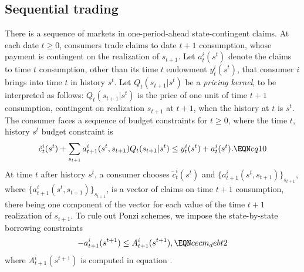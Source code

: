 \subsection{Sequential trading}
There is a sequence of markets in one-period-ahead
state-contingent
 claims.    At each date $t \geq 0$,
consumers trade claims to date $t+1$ consumption, whose payment
is  contingent
on the realization of $s_{t+1}$.   Let $a_t^i(s^t)$ denote the
claims to time $t$ consumption, other than its time $t$  endowment $y_t^i(s^t)$,
that consumer $i$ brings into time $t$ in history $s^t$. Let
$ Q_t(s_{t+1} | s^t)$
be a {\it pricing kernel},  to be interpreted as follows:
$Q_t(s_{t+1} | s^t)$ is the price of one unit of time $t+1$ consumption,
contingent on realization $s_{t+1}$ at $t+1$, when the
history at $t$ is $s^t$.
The consumer faces a sequence of budget constraints
for $t \geq 0$, where the time $t$, history $s^t$ budget constraint is
$$ \tilde c_t^i(s^t) + \sum_{s_{t+1}} a^i_{t+1}(s^t, s_{t+1}) Q_t(s_{t+1} | s^t)
     \leq  y_t^i(s^t) + a_t^i(s^t) . \EQN eq10   $$
At time $t$ after history $s^t$, a consumer chooses 
$\tilde c^i_t(s^t)$
and $\{a^i_{t+1}(s^t, s_{t+1})\}_{s_{t+1}}$, where
$\{a^i_{t+1}(s^t, s_{t+1})\}_{s_{t+1}}$,   is a vector of claims on time $t+1$ consumption,
there being one component of the vector for each  value of the time $t+1$ realization of
$s_{t+1}$.    To rule out Ponzi schemes,
we impose the state-by-state borrowing
constraints
$$ - a^i_{t+1}(s^{t+1}) \leq  A^i_{t+1}(s^{t+1}),        \EQN cecm_debt2$$
where $A^i_{t+1}(s^{t+1})$ is computed in equation .


